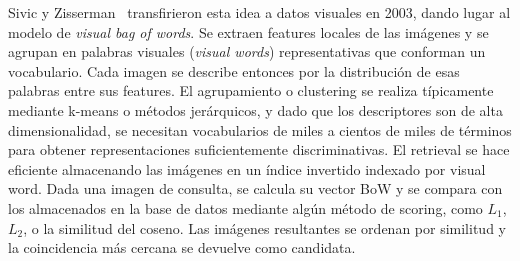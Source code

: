 Sivic y Zisserman~\cite{sivic2003videogoogle} transfirieron esta idea a datos visuales en 2003, dando lugar al modelo de \textit{visual bag of words}. Se extraen features locales de las imágenes y se agrupan en palabras visuales (\textit{visual words}) representativas que conforman un vocabulario. Cada imagen se describe entonces por la distribución de esas palabras entre sus features. El agrupamiento o clustering se realiza típicamente mediante k-means o métodos jerárquicos, y dado que los descriptores son de alta dimensionalidad, se necesitan vocabularios de miles a cientos de miles de términos para obtener representaciones suficientemente discriminativas. El retrieval se hace eficiente almacenando las imágenes en un índice invertido indexado por visual word. Dada una imagen de consulta, se calcula su vector BoW y se compara con los almacenados en la base de datos mediante algún método de scoring, como $L_1$, $L_2$, o la similitud del coseno. Las imágenes resultantes se ordenan por similitud y la coincidencia más cercana se devuelve como candidata.


